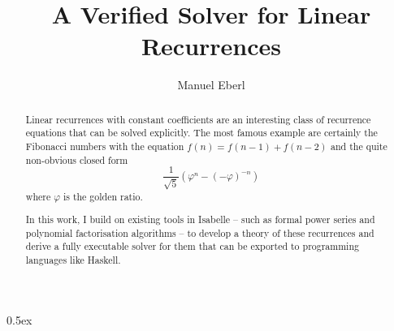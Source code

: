 \documentclass[11pt,a4paper]{article}
\begin{document}
\title{A Verified Solver for Linear Recurrences}
\author{Manuel Eberl}
\maketitle

\begin{abstract}
Linear recurrences with constant coefficients are an interesting class of recurrence equations that can be solved explicitly. The most famous example are certainly the Fibonacci numbers with the equation $f(n) = f(n-1) + f(n-2)$
and the quite non-obvious closed form \[\frac{1}{\sqrt 5} (\varphi^n - (-\varphi)^{-n})\] where $\varphi$ 
is the golden ratio.

In this work, I build on existing tools in Isabelle -- such as formal power series and polynomial factorisation algorithms --
to develop a theory of these recurrences and derive a fully executable solver for them that can be exported to programming languages like Haskell.
\end{abstract}

\tableofcontents
\newpage
\parindent 0pt\parskip 0.5ex





\end{document}
